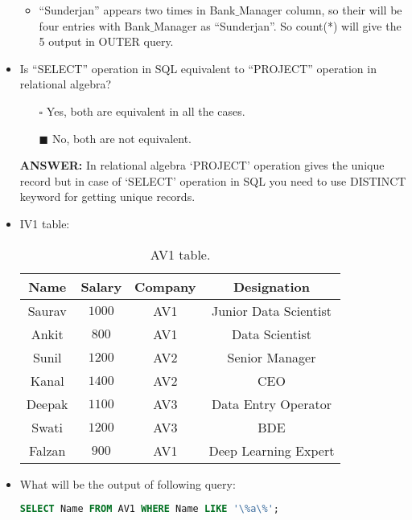 \documentclass[10pt]{article}
\newcommand{\lightrule}{%
	\arrayrulecolor{black!30}%
	\midrule[\lightrulewidth]%
	\arrayrulecolor{black}}
\begin{document}
\begin{itemize}
\begin{itemize}
				\item “Sunderjan” appears two times in Bank$\_$Manager column, so their will be four entries with Bank$\_$Manager as “Sunderjan”. So count(*) will give the 5 output in OUTER query.
			\end{itemize}
		\newpage

		\item  Is “SELECT” operation in SQL equivalent to “PROJECT” operation in relational algebra?
			\begin{enumerate}
				\item[$\square$] Yes, both are equivalent in all the cases.
				\item[$\blacksquare$] No, both are not equivalent. 
			\end{enumerate}
			\color{red} \textbf{ANSWER:} \color{black} In relational algebra ‘PROJECT’ operation gives the unique record but in case of ‘SELECT’ operation in SQL you need to use DISTINCT keyword for getting unique records.
		
		\item IV1 table:
			\begin{table}[H]
				\centering
				\begin{tabular}{@{} *{4}{c} @{}}
					\toprule
						\textbf{Name} & \textbf{Salary} & \textbf{Company} & \textbf{Designation} \\
					\midrule
						Saurav & $1000$ & AV1 & Junior Data Scientist \\ 
					\lightrule
						Ankit & $800$ & AV1 & Data Scientist \\ 
					\lightrule
						Sunil & $1200$ & AV2 & Senior Manager \\ 
					\lightrule
						Kanal & $1400$ & AV2 & CEO \\ 
					\lightrule
						Deepak & $1100$ & AV3 & Data Entry Operator \\ 
					\lightrule
						Swati & $1200$ & AV3 & BDE \\ 
					\lightrule
						Falzan & $900$ & AV1 & Deep Learning Expert \\ 
					\bottomrule
				\end{tabular}
				\caption{AV1 table.}
			\end{table}

		\item What will be the output of following query: 
			\begin{lstlisting}[language=SQL,firstline=1, lastline=1] 
				SELECT Name FROM AV1 WHERE Name LIKE '\%a\%';
			\end{lstlisting}


\end{itemize}
\end{document}
